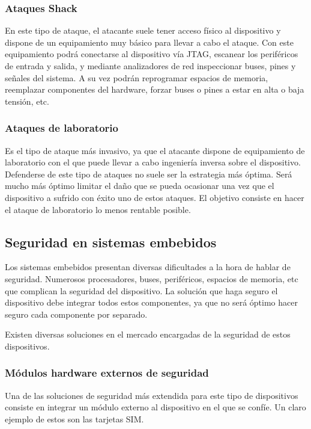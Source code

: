 \subsubsection{Ataques Shack}
En este tipo de ataque, el atacante suele tener acceso físico al dispositivo y dispone de un equipamiento muy básico para llevar a cabo el ataque. Con este equipamiento podrá conectarse al dispositivo vía JTAG, escanear los periféricos de entrada y salida, y mediante analizadores de red inspeccionar buses, pines y señales del sistema. A su vez podrán reprogramar espacios de memoria, reemplazar componentes del hardware, forzar buses o pines a estar en alta o baja tensión, etc.

\subsubsection{Ataques de laboratorio}
Es el tipo de ataque más invasivo, ya que el atacante dispone de equipamiento de laboratorio con el que puede llevar a cabo ingeniería inversa sobre el dispositivo. Defenderse de este tipo de ataques no suele ser la estrategia más óptima. Será mucho más óptimo limitar el daño que se pueda ocasionar una vez que el dispositivo a sufrido con éxito uno de estos ataques. El objetivo consiste en hacer el ataque de laboratorio lo menos rentable posible.

\subsection{Seguridad en sistemas embebidos}
Los sistemas embebidos presentan diversas dificultades a la hora de hablar de seguridad. Numerosos procesadores, buses, periféricos, espacios de memoria, etc que complican la seguridad del dispositivo. La solución que haga seguro el dispositivo debe integrar todos estos componentes, ya que no será óptimo hacer seguro cada componente por separado. \newline

Existen diversas soluciones en el mercado encargadas de la seguridad de estos dispositivos.

\subsubsection{Módulos hardware externos de seguridad}
Una de las soluciones de seguridad más extendida para este tipo de dispositivos consiste en integrar un módulo externo al dispositivo en el que se confíe. Un claro ejemplo de estos son las tarjetas SIM.

